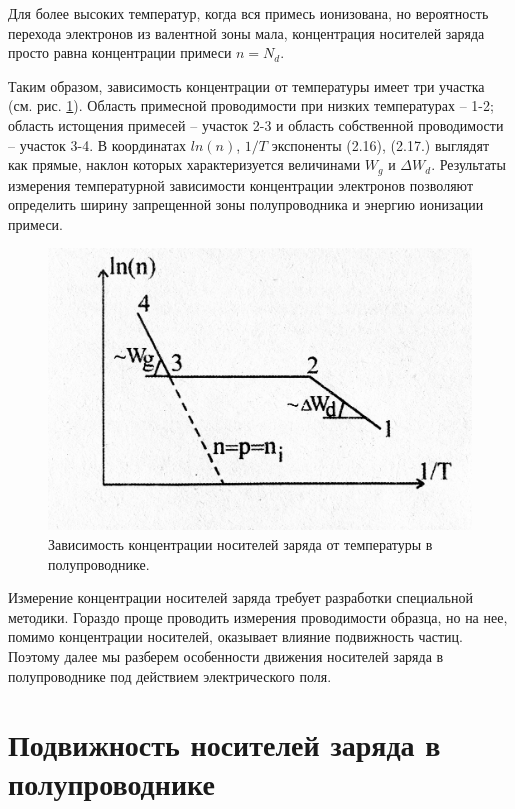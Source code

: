 Для более высоких температур, когда вся примесь ионизована, но вероятность перехода электронов из валентной зоны мала,
концентрация носителей заряда просто равна концентрации примеси $n=N_d$. 


Таким образом, зависимость концентрации от температуры имеет три участка (см. рис. \ref{fig:2.2}). Область примесной проводимости
при низких температурах – 1-2; область истощения примесей – участок 2-3 и область собственной проводимости – участок
3-4. В координатах $ln(n)$, $1/T$ экспоненты (2.16), (2.17.) выглядят как прямые, наклон которых характеризуется величинами
$W_g$ и $\Delta W_d$. Результаты измерения температурной зависимости концентрации электронов позволяют определить ширину
запрещенной зоны полупроводника и энергию ионизации примеси.

\begin{figure}[h!]
	\centering
	\includegraphics[width = .7\linewidth]{img/23.jpg}
	\caption{Зависимость концентрации носителей заряда от температуры в полупроводнике.}
	\label{fig:2.2}
\end{figure}

Измерение концентрации носителей заряда требует разработки специальной методики. Гораздо проще проводить измерения
проводимости образца, но на нее, помимо концентрации носителей, оказывает влияние подвижность частиц. Поэтому далее мы
разберем особенности движения носителей заряда в полупроводнике под действием электрического поля. 


\section{Подвижность носителей заряда в полупроводнике}

